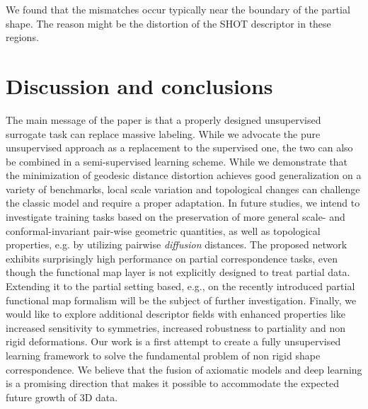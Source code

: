 \documentclass[10pt,twocolumn,letterpaper]{article}
\begin{document}
We found that the mismatches occur typically near the boundary of the partial shape. The reason might be the distortion of the SHOT descriptor in these regions. %



\section{Discussion and conclusions}
The main message of the paper is that a properly designed unsupervised surrogate task can replace massive labeling. 
While we advocate the pure unsupervised approach as a replacement to the supervised one, the two can also be combined in a semi-supervised learning scheme. 
While we demonstrate that the minimization of geodesic distance distortion achieves good generalization on a variety of benchmarks, local scale variation and topological changes can challenge the classic model and require a proper adaptation.
In future studies, we intend to investigate training tasks based on the preservation of more general scale- and conformal-invariant pair-wise geometric quantities, as well as topological properties, e.g. by utilizing pairwise \textit{diffusion} distances.
The proposed network exhibits surprisingly high performance on partial correspondence tasks, even though the functional map layer is not explicitly designed to treat partial data. Extending it to the partial setting based, e.g., on the recently introduced partial functional map formalism \cite{rodola2017partial,litany2017fully} will be the subject of further investigation.
Finally, we would like to explore additional descriptor fields with enhanced properties like increased sensitivity to symmetries, increased robustness to partiality and non rigid deformations. Our work is a first attempt to create a fully unsupervised learning framework to solve the fundamental problem of non rigid shape correspondence. We believe that the fusion of axiomatic models and deep learning is a promising direction that makes it possible to accommodate the expected future growth of 3D data. 
\end{document}

